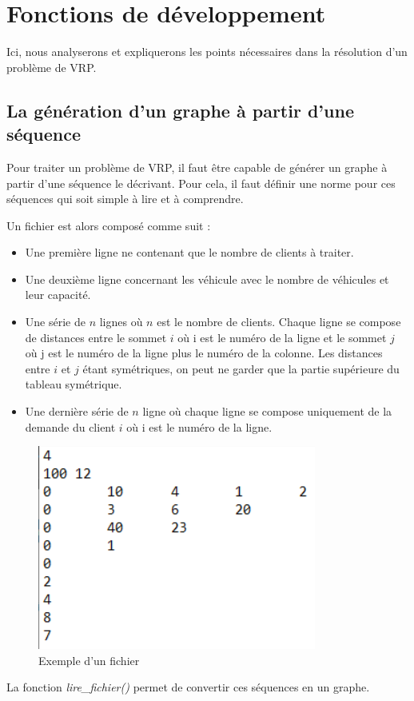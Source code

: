 \documentclass[12pt]{article}
\begin{document}
	 \section{Fonctions de développement}
	 Ici, nous analyserons et expliquerons les points nécessaires dans la résolution d'un problème de VRP.
	 
	 \subsection{La génération d'un graphe à partir d'une séquence}
	 Pour traiter un problème de VRP, il faut être capable de générer un graphe à partir d'une séquence le décrivant. Pour cela, il faut définir une norme pour ces séquences qui soit simple à lire et à comprendre.\\\par
	 Un fichier est alors composé comme suit :\\\par
	 \begin{itemize}
	     \item Une première ligne ne contenant que le nombre de clients à traiter.
          \item Une deuxième ligne concernant les véhicule avec le nombre de véhicules et leur capacité.
	     \item Une série de $n$ lignes où $n$ est le nombre de clients. Chaque ligne se compose de distances entre le sommet $i$ où i est le numéro de la ligne et le sommet $j$ où j est le numéro de la ligne plus le numéro de la colonne. Les distances entre $i$ et $j$ étant symétriques, on peut ne garder que la partie supérieure du tableau symétrique.\\
         \item Une dernière série de $n$ ligne où chaque ligne se compose uniquement de la demande du client $i$ où i est le numéro de la ligne.
	 \end{itemize}\par

  \begin{figure}[!h]
	    \centering
	    \includegraphics[scale = 1]{fichier.png}
	    \caption{Exemple d'un fichier}
	    \label{fig1}
	\end{figure}\par
	 La fonction \emph{lire\_fichier()} permet de convertir ces séquences en un graphe.
\end{document}
